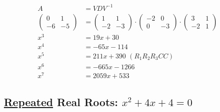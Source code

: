 \documentclass[12pt,a4paper]{article}
\begin{document}
\begin{align}
A &= VDV^{-1} \\
\left( \begin{matrix} 0 & 1 \\ -6 & -5 \end{matrix} \right)
&=
\left( \begin{matrix}  1 & 1 \\ -2 & -3 \end{matrix} \right) \cdot
\left( \begin{matrix} -2 & 0 \\  0 & -3 \end{matrix} \right) \cdot
\left( \begin{matrix}  3 & 1 \\ -2 & 1 \end{matrix} \right) \\
x^3 &= 19x + 30 \\
x^4 &= -65x - 114 \\
x^5 &= 211x + 390\,\,(R_1R_2R_3CC) \\
x^6 &= -665x - 1266 \\
x^7 &= 2059x + 533
\end{align}

\subsection{\href{https://www.wolframalpha.com/input/?i=e\%5Ex+\%3D+3+*+exp(-2)+\%2B+e\%5E(-2)+*+x}{\color{blue}\underline{Repeated}} Real Roots: $x^2 + 4x + 4 = 0$}
\end{document}
